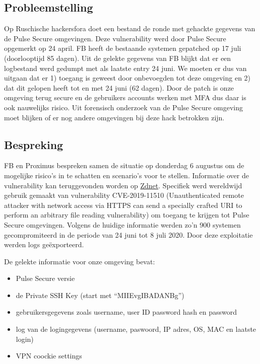 \documentclass[11pt]{article}
\begin{document}
\subsection{Probleemstelling}
\label{sec:orgc3aa0bc}

Op Ruschische hackersfora doet een bestand de ronde met gehackte gegevens van de Pulse Secure omgevingen. Deze vulnerability werd door Pulse Secure opgemerkt op 24 april. FB heeft de bestaande systemen gepatched op 17 juli (doorlooptijd 85 dagen). Uit de gelekte gegevens van FB blijkt dat er een logbestand werd gedumpt met als laatste entry 24 juni. We moeten er dus van uitgaan dat er 1) toegang is geweest door onbevoegden tot deze omgeving en 2) dat dit gelopen heeft tot en met 24 juni (62 dagen). Door de patch is onze omgeving terug secure en de gebruikers accounts werken met MFA dus daar is ook nauwelijks risico. Uit forensisch onderzoek van de Pulse Secure omgeving moet blijken of er nog andere omgevingen bij deze hack betrokken zijn.

\subsection{Bespreking}
\label{sec:org43b9923}

FB en Proximus bespreken samen de situatie op donderdag 6 augustus om de mogelijke risico's in te schatten en scenario's voor te stellen. Informatie over de vulnerability kan teruggevonden worden op \href{https://www.zdnet.com/article/hacker-leaks-passwords-for-900-enterprise-vpn-servers/}{Zdnet}. Specifiek werd wereldwijd gebruik gemaakt van vulnerability CVE-2019-11510 (Unauthenticated remote attacker with network access via HTTPS can send a specially crafted URI to perform an arbitrary file reading vulnerability) om toegang te krijgen tot Pulse Secure omgevingen. Volgens de huidige informatie werden zo'n 900 systemen gecompromiteerd in de periode van 24 juni tot 8 juli 2020. Door deze exploitatie werden logs geëxporteerd.

De gelekte informatie voor onze omgeving bevat:
\begin{itemize}
\item Pulse Secure versie
\item de Private SSH Key (start met “MIIEvgIBADANBg”)
\item gebruikersgegevens zoals username, user ID password hash en password
\item log van de logingegevens (username, paswoord, IP adres, OS, MAC en laatste login)
\item VPN coockie settings
\end{itemize}
\end{document}
